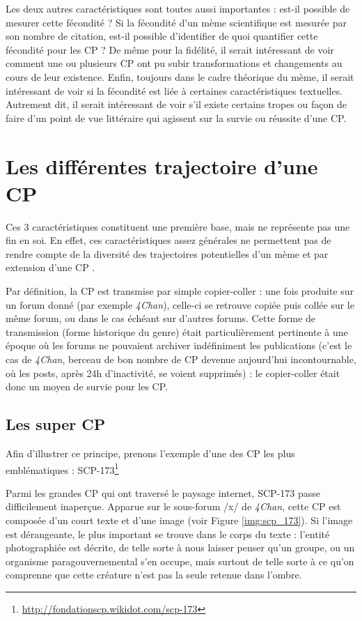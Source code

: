 \documentclass[12pt,a4paper,oneside,titlepage]{book} %
\begin{document}
 Les deux autres caractéristiques sont toutes aussi importantes : est-il possible de mesurer cette fécondité ? Si la fécondité d’un mème scientifique est mesurée par son nombre de citation, est-il possible d’identifier de quoi quantifier cette fécondité pour les CP ? De même pour la fidélité, il serait intéressant de voir comment une ou plusieurs CP ont pu subir transformations et changements au cours de leur existence. Enfin, toujours dans le cadre théorique du mème, il serait intéressant de voir si la fécondité est liée à certaines caractéristiques textuelles. Autrement dit, il serait intéressant de voir s’il existe certains tropes ou façon de faire d’un point de vue littéraire qui agissent sur la survie ou réussite d’une CP.
	
	\section{Les différentes trajectoire d'une CP}
	
	Ces 3 caractéristiques constituent une première base, mais ne représente pas une fin en soi. En effet, ces caractéristiques assez générales ne permettent pas de rendre compte de la diversité des trajectoires potentielles d’un mème et par extension d’une CP .
	
	Par définition, la CP est transmise par simple copier-coller : une fois produite sur un forum donné (par exemple \emph{4Chan}), celle-ci se retrouve copiée puis collée sur le même forum, ou dans le cas échéant sur d’autres forums. Cette forme de transmission (forme historique du genre) était particulièrement pertinente à une époque où les forums ne pouvaient archiver indéfiniment les publications (c’est le cas de \emph{4Chan}, berceau de bon nombre de CP devenue aujourd’hui incontournable, où les posts, après 24h d'inactivité, se voient supprimés) : le copier-coller était donc un moyen de survie pour les CP. 
	
	\subsection{Les super CP}
	
	Afin d'illustrer ce principe, prenons l'exemple d'une des CP les plus emblématiques : SCP-173\footnote{\url{http://fondationscp.wikidot.com/scp-173}}
	
	Parmi les grandes CP qui ont traversé le paysage internet, SCP-173 passe difficilement inaperçue. Apparue sur le sous-forum /x/ de \emph{4Chan}, cette CP est composée d'un court texte et d'une image (voir Figure \ref{img:scp_173}). Si l'image est dérangeante, le plus important se trouve dans le corps du texte : l'entité photographiée est décrite, de telle sorte à nous laisser penser qu'un groupe, ou un organisme paragouvernemental s'en occupe, mais surtout de telle sorte à ce qu’on comprenne que cette créature n'est pas la seule retenue dans l’ombre. 
\end{document}
